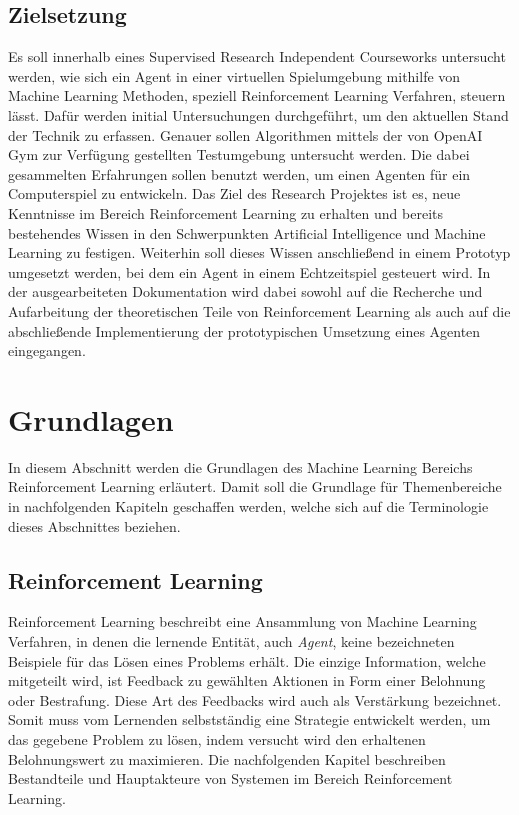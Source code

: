\documentclass[11pt]{scrartcl}
\begin{document}
\subsection{Zielsetzung}
Es soll innerhalb eines Supervised Research Independent Courseworks untersucht werden, wie
sich ein Agent in einer virtuellen Spielumgebung mithilfe von Machine Learning Methoden,
speziell Reinforcement Learning Verfahren, steuern lässt. Dafür werden initial
Untersuchungen durchgeführt, um den aktuellen Stand der Technik zu erfassen. Genauer
sollen Algorithmen mittels der von OpenAI Gym zur Verfügung gestellten Testumgebung
untersucht werden. Die dabei gesammelten Erfahrungen sollen benutzt werden, um einen
Agenten für ein Computerspiel zu entwickeln. Das Ziel des Research Projektes ist es, neue
Kenntnisse im Bereich Reinforcement Learning zu erhalten und bereits bestehendes Wissen in
den Schwerpunkten Artificial Intelligence und Machine Learning zu festigen. Weiterhin soll
dieses Wissen anschließend in einem Prototyp umgesetzt werden, bei dem ein Agent in einem
Echtzeitspiel gesteuert wird. In der ausgearbeiteten Dokumentation wird dabei sowohl auf die
Recherche und Aufarbeitung der theoretischen Teile von Reinforcement Learning als auch auf
die abschließende Implementierung der prototypischen Umsetzung eines Agenten eingegangen.
\newpage

\section{Grundlagen}
In diesem Abschnitt werden die Grundlagen des Machine Learning Bereichs Reinforcement Learning 
erläutert. Damit soll die Grundlage für Themenbereiche in nachfolgenden Kapiteln geschaffen
werden, welche sich auf die Terminologie dieses Abschnittes beziehen.


\subsection{Reinforcement Learning}
Reinforcement Learning beschreibt eine Ansammlung von Machine Learning Verfahren, in denen die 
lernende Entität, auch \textit{Agent}, keine bezeichneten Beispiele für das Lösen eines Problems
erhält. Die einzige Information, welche mitgeteilt wird, ist Feedback zu gewählten Aktionen in Form
einer Belohnung oder Bestrafung. Diese Art des Feedbacks wird auch als Verstärkung bezeichnet.
Somit muss vom Lernenden selbstständig eine Strategie entwickelt werden, um das gegebene
Problem zu lösen, indem versucht wird den erhaltenen Belohnungswert zu maximieren. Die nachfolgenden
Kapitel beschreiben Bestandteile und Hauptakteure von Systemen im Bereich Reinforcement Learning.
\end{document}
